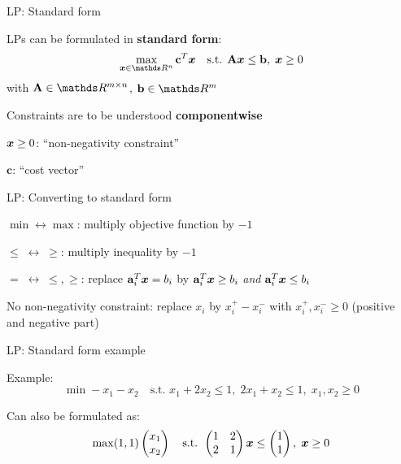 \documentclass[11pt,compress,t,notes=noshow, xcolor=table]{beamer}
\begin{document}
\begin{framei}[sep=L]{LP: Standard form}
\item LPs can be formulated in \textbf{standard form}:
$$
\max_{\xv \in \R^n} \mathbf{c}^T\xv \quad \text{s.t. } \Amat\xv \le \bv, \; \xv \ge 0
$$
with $\Amat \in \R^{m\times n}$, $\bv \in \R^m$
\item Constraints are to be understood \textbf{componentwise}
\item $\bm{x} \ge 0$: ``non-negativity constraint''
\item $\mathbf{c}$: ``cost vector''
\end{framei}


\begin{framei}[sep=L]{LP: Converting to standard form}
\item $\min \longleftrightarrow \max$: multiply objective function by $-1$
\item $\leq \; \longleftrightarrow \; \geq$: multiply inequality by $-1$
\item $= \; \longleftrightarrow \; \leq,\geq$: replace $\mathbf{a}_i^T\bm{x}=b_i$ by $\mathbf{a}_i^T\bm{x}\ge b_i$ \textit{and} $\mathbf{a}_i^T\bm{x}\le b_i$
\item No non-negativity constraint: replace $x_i$ by $x_i^+ - x_i^-$ with $x_i^+, x_i^- \ge 0$ (positive and negative part)
\end{framei}


\begin{framei}[sep=L]{LP: Standard form example}
\item Example:
$$
\min - x_1 - x_2 \quad \text{s.t. } x_1 + 2x_2 \le 1, \; 2x_1 + x_2 \le 1, \; x_1, x_2 \ge 0
$$
\item Can also be formulated as:
$$
\max (1, 1) \begin{pmatrix} x_1 \\ x_2 \end{pmatrix} \quad \text{s.t. }  \begin{pmatrix}  1 &  2 \\  2 &  1 \end{pmatrix} \bm{x} \le \begin{pmatrix}  1 \\  1 \end{pmatrix}, \; \bm{x} \ge 0
$$
\end{framei}
\end{document}
